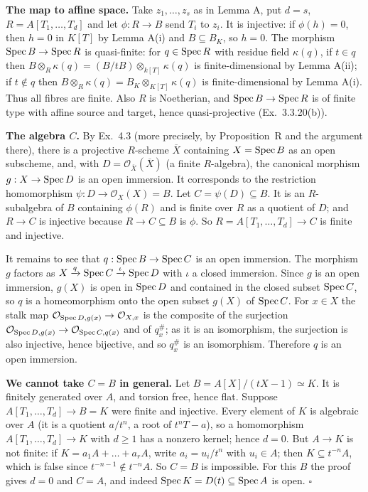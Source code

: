 \documentclass[11pt]{article}
\begin{document}
\textbf{The map to affine space.} Take $z_1,\dots,z_s$ as in Lemma A, put $d=s$, $R=A[T_1,\dots,T_d]$ and let $\phi:R\to B$ send $T_i$ to $z_i$. It is injective: if $\phi(h)=0$, then $h=0$ in $K[T]$ by Lemma A(i) and $B\subseteq B_K$, so $h=0$. The morphism $\operatorname{Spec} B\to\operatorname{Spec} R$ is quasi-finite: for $q\in\operatorname{Spec} R$ with residue field $\kappa(q)$, if $t\in q$ then $B\otimes_R\kappa(q)=(B/tB)\otimes_{k[T]}\kappa(q)$ is finite-dimensional by Lemma A(ii); if $t\notin q$ then $B\otimes_R\kappa(q)=B_K\otimes_{K[T]}\kappa(q)$ is finite-dimensional by Lemma A(i). Thus all fibres are finite. Also $R$ is Noetherian, and $\operatorname{Spec} B\to\operatorname{Spec} R$ is of finite type with affine source and target, hence quasi-projective (Ex.~3.3.20(b)).

\textbf{The algebra $C$.} By Ex.~4.3 (more precisely, by Proposition~R and the argument there), there is a projective $R$-scheme $\overline X$ containing $X=\operatorname{Spec} B$ as an open subscheme, and, with $D=\mathcal O_{\overline X}(\overline X)$ (a finite $R$-algebra), the canonical morphism $g:X\to\operatorname{Spec} D$ is an open immersion. It corresponds to the restriction homomorphism $\psi:D\to\mathcal O_X(X)=B$. Let $C=\psi(D)\subseteq B$. It is an $R$-subalgebra of $B$ containing $\phi(R)$ and is finite over $R$ as a quotient of $D$; and $R\to C$ is injective because $R\to C\subseteq B$ is $\phi$. So $R=A[T_1,\dots,T_d]\to C$ is finite and injective.

It remains to see that $q:\operatorname{Spec} B\to\operatorname{Spec} C$ is an open immersion. The morphism $g$ factors as $X\xrightarrow{q}\operatorname{Spec} C\xrightarrow{\iota}\operatorname{Spec} D$ with $\iota$ a closed immersion. Since $g$ is an open immersion, $g(X)$ is open in $\operatorname{Spec} D$ and contained in the closed subset $\operatorname{Spec} C$, so $q$ is a homeomorphism onto the open subset $g(X)$ of $\operatorname{Spec} C$. For $x\in X$ the stalk map $\mathcal O_{\operatorname{Spec} D,g(x)}\to\mathcal O_{X,x}$ is the composite of the surjection $\mathcal O_{\operatorname{Spec} D,g(x)}\to\mathcal O_{\operatorname{Spec} C,q(x)}$ and of $q^\#_x$; as it is an isomorphism, the surjection is also injective, hence bijective, and so $q^\#_x$ is an isomorphism. Therefore $q$ is an open immersion.

\textbf{We cannot take $C=B$ in general.} Let $B=A[X]/(tX-1)\simeq K$. It is finitely generated over $A$, and torsion free, hence flat. Suppose $A[T_1,\dots,T_d]\to B=K$ were finite and injective. Every element of $K$ is algebraic over $A$ (it is a quotient $a/t^n$, a root of $t^nT-a$), so a homomorphism $A[T_1,\dots,T_d]\to K$ with $d\ge1$ has a nonzero kernel; hence $d=0$. But $A\to K$ is not finite: if $K=a_1A+\dots+a_rA$, write $a_i=u_i/t^{n}$ with $u_i\in A$; then $K\subseteq t^{-n}A$, which is false since $t^{-n-1}\notin t^{-n}A$. So $C=B$ is impossible. For this $B$ the proof gives $d=0$ and $C=A$, and indeed $\operatorname{Spec} K=D(t)\subseteq\operatorname{Spec} A$ is open. \hfill$\square$
\end{document}
